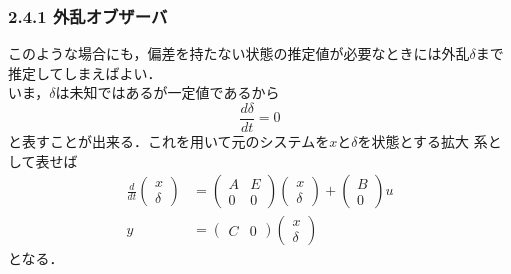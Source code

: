 \begin{frame}[t]
\frametitle{2.4.1 外乱オブザーバ}
このような場合にも，偏差を持たない状態の推定値が必要なときには外乱$\delta$まで推定してしまえばよい．
\\[3mm]

いま，$\delta$は未知ではあるが一定値であるから
\begin{equation}
 \frac{d \delta}{dt} = 0
\end{equation}
と表すことが出来る．これを用いて元のシステムを$x$と$\delta$を状態とする拡大
系として表せば
\begin{align}
 \frac{d}{dt}
  \left(\begin{array}{c}
         x \\
	 \delta
	\end{array}\right)
  &=
  \left(\begin{array}{cc}
         A & E \\
	 0 & 0
	\end{array}\right)
  \left(\begin{array}{c}
         x \\
	 \delta
	\end{array}\right)
  +
  \left(\begin{array}{c}
         B \\
	 0
	\end{array}\right)
  u \\
 y &=
  \left(\begin{array}{cc}
         C & 0
	\end{array}\right) 
  \left(\begin{array}{c}
	 x \\
	 \delta
	\end{array}\right)
\end{align}
となる．
\end{frame}

